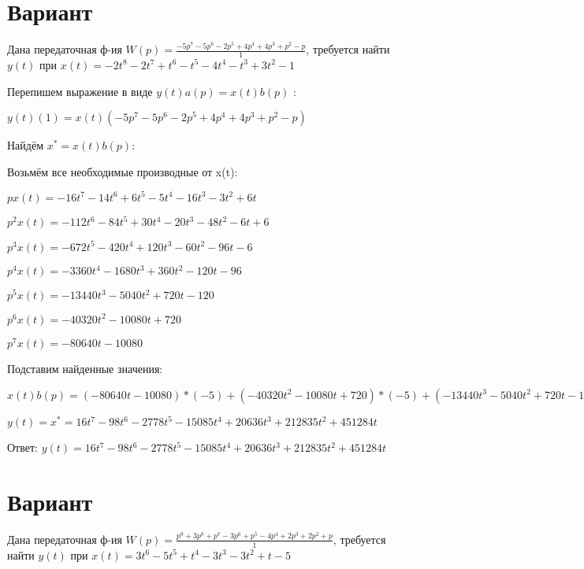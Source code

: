 \documentclass{article}
\begin{document}
{{{\section{Вариант}

Дана передаточная ф-ия $W(p)=\frac{-5p^{7}-5p^{6}-2p^{5}+4p^{4}+4p^{3}+p^{2}-p}{1}$, требуется найти $y(t)$ при $x(t)=-2t^{8}-2t^{7}+t^{6}-t^{5}-4t^{4}-t^{3}+3t^{2}-1$

Перепишем выражение в виде $y(t)a(p)=x(t)b(p)$ :

$y(t)(1)=x(t)(-5p^{7}-5p^{6}-2p^{5}+4p^{4}+4p^{3}+p^{2}-p)$

Найдём $x^*=x(t)b(p)$:

Возьмём все необходимые производные от x(t):

$px(t)=-16t^{7}-14t^{6}+6t^{5}-5t^{4}-16t^{3}-3t^{2}+6t$

$p^2x(t)=-112t^{6}-84t^{5}+30t^{4}-20t^{3}-48t^{2}-6t+6$

$p^3x(t)=-672t^{5}-420t^{4}+120t^{3}-60t^{2}-96t-6$

$p^4x(t)=-3360t^{4}-1680t^{3}+360t^{2}-120t-96$

$p^5x(t)=-13440t^{3}-5040t^{2}+720t-120$

$p^6x(t)=-40320t^{2}-10080t+720$

$p^7x(t)=-80640t-10080$

Подставим найденные значения:

$x(t)b(p) = (-80640t-10080)*(-5)+(-40320t^{2}-10080t+720)*(-5)+(-13440t^{3}-5040t^{2}+720t-120)*(-2)+(-3360t^{4}-1680t^{3}+360t^{2}-120t-96)*4+(-672t^{5}-420t^{4}+120t^{3}-60t^{2}-96t-6)*4+(-112t^{6}-84t^{5}+30t^{4}-20t^{3}-48t^{2}-6t+6)*1+(-16t^{7}-14t^{6}+6t^{5}-5t^{4}-16t^{3}-3t^{2}+6t)*(-1)+=16t^{7}-98t^{6}-2778t^{5}-15085t^{4}+20636t^{3}+212835t^{2}+451284t$





$y(t)=x^*=16t^{7}-98t^{6}-2778t^{5}-15085t^{4}+20636t^{3}+212835t^{2}+451284t$

Ответ: $y(t) = 16t^{7}-98t^{6}-2778t^{5}-15085t^{4}+20636t^{3}+212835t^{2}+451284t$

\section{Вариант}

Дана передаточная ф-ия $W(p)=\frac{p^{9}+3p^{8}+p^{7}-3p^{6}+p^{5}-4p^{4}+2p^{3}+2p^{2}+p}{1}$, требуется найти $y(t)$ при $x(t)=3t^{6}-5t^{5}+t^{4}-3t^{3}-3t^{2}+t-5$

}}}
\end{document}
